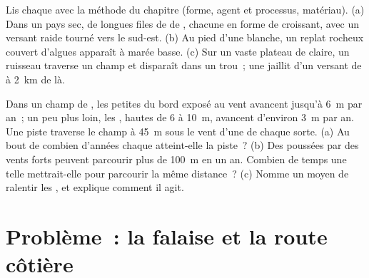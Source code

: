 \begin{exercise}[$\star\star\star$]\label{exo:g9:landforms:11}
Lis chaque  avec la méthode du chapitre (forme, agent et processus,
matériau). (a) Dans un pays sec, de longues files de  de ,
chacune en forme de croissant, avec un versant raide tourné vers le
sud-est. (b) Au pied d'une  blanche, un replat rocheux couvert
d'algues apparaît à marée basse. (c) Sur un vaste plateau de 
claire, un ruisseau traverse un champ et disparaît dans un trou~; une
 jaillit d'un versant de  à \qty{2}{km} de là.
\end{exercise}

\begin{exercise}[$\star\star\star$]\label{exo:g9:landforms:12}
Dans un champ de , les petites  du bord exposé au vent avancent
jusqu'à \qty{6}{m} par an~; un peu plus loin, les , hautes de 6 à
\qty{10}{m}, avancent d'environ \qty{3}{m} par an. Une piste traverse le
champ à \qty{45}{m} sous le vent d'une  de chaque sorte. (a) Au bout
de combien d'années chaque  atteint-elle la piste~? (b) Des 
poussées par des vents forts peuvent parcourir plus de \qty{100}{m} en un
an. Combien de temps une telle  mettrait-elle pour parcourir la même
distance~? (c) Nomme un moyen de ralentir les , et explique comment
il agit.
\end{exercise}

\section{Problème~: la falaise et la route côtière}

